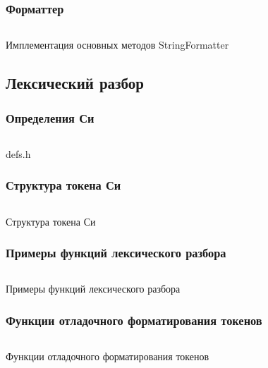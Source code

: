 \subsubsection{Форматтер}
\begin{code}
  \inputminted[breaklines=true, xleftmargin=1em, linenos, frame=single,
  framesep=10pt, fontsize=\footnotesize]
  {c}{listings/intro/fmt.c}
  \caption{Имплементация основных методов StringFormatter}
  \label{extras:fmt_impl}
\end{code}


\subsection{Лексический разбор}

\subsubsection{Определения Си}
\begin{code}
  \inputminted[breaklines=true, xleftmargin=1em, linenos, frame=single,
  framesep=10pt, fontsize=\footnotesize]
  {c}{listings/lexing/def.h}
	\caption{defs.h}
    \label{extras:c_defs}
\end{code}

\subsubsection{Структура токена Си}
\begin{code}
  \inputminted[breaklines=true, xleftmargin=1em, linenos, frame=single,
  framesep=10pt, fontsize=\footnotesize]
  {c}{listings/lexing/token.c}
	\caption{Структура токена Си}
    \label{extras:c_token}
\end{code}

\subsubsection{Примеры функций лексического разбора}
\begin{code}
  \inputminted[breaklines=true, xleftmargin=1em, linenos, frame=single,
  framesep=10pt, fontsize=\footnotesize]
  {c}{listings/lexing/lexer_fns.c}
	\caption{Примеры функций лексического разбора}
    \label{extras:lexer_fns}
\end{code}

\subsubsection{Функции отладочного форматирования токенов}
\begin{code}
  \inputminted[breaklines=true, xleftmargin=1em, linenos, frame=single,
  framesep=10pt, fontsize=\footnotesize]
  {c}{listings/lexing/token.c}
	\caption{Функции отладочного форматирования токенов}
    \label{extras:token_dbg_print}
\end{code}



